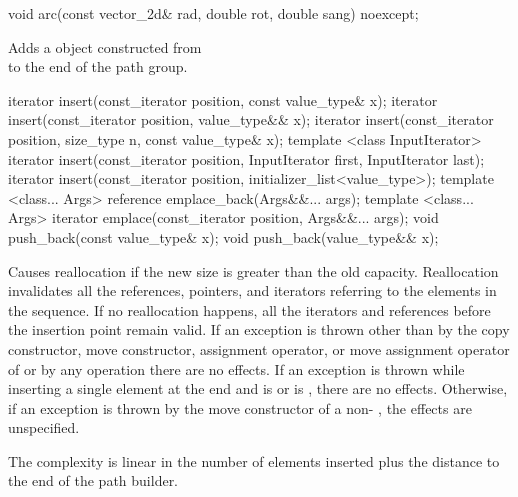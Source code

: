 %
\begin{itemdecl}
void arc(const vector_2d& rad, double rot, double sang) noexcept;
\end{itemdecl}
\begin{itemdescr}
\pnum
\effects
Adds a  object constructed from \\  to the end of the path group.
\end{itemdescr}

%
%
%
\begin{itemdecl}
iterator insert(const_iterator position, const value_type& x);
iterator insert(const_iterator position, value_type&& x);
iterator insert(const_iterator position, size_type n, const value_type& x);
template <class InputIterator>
iterator insert(const_iterator position, InputIterator first,
  InputIterator last);
iterator insert(const_iterator position, initializer_list<value_type>);
template <class... Args>
reference emplace_back(Args&&... args);
template <class... Args>
iterator emplace(const_iterator position, Args&&... args);
void push_back(const value_type& x);
void push_back(value_type&& x);
\end{itemdecl}

\begin{itemdescr}
\pnum
\remarks
Causes reallocation if the new size is greater than the old capacity.
Reallocation invalidates all the references, pointers, and iterators
referring to the elements in the sequence.
If no reallocation happens, all the iterators and references before the insertion point remain valid.
If an exception is thrown other than by
the copy constructor, move constructor,
assignment operator, or move assignment operator of
 or by any  operation
there are no effects.
If an exception is thrown while inserting a single element at the end and
 is  or 
is , there are no effects.
Otherwise, if an exception is thrown by the move constructor of a non-
, the effects are unspecified.

\pnum
\complexity
The complexity is linear in the number of elements inserted plus the 
distance to the end of the path builder.
\end{itemdescr}

